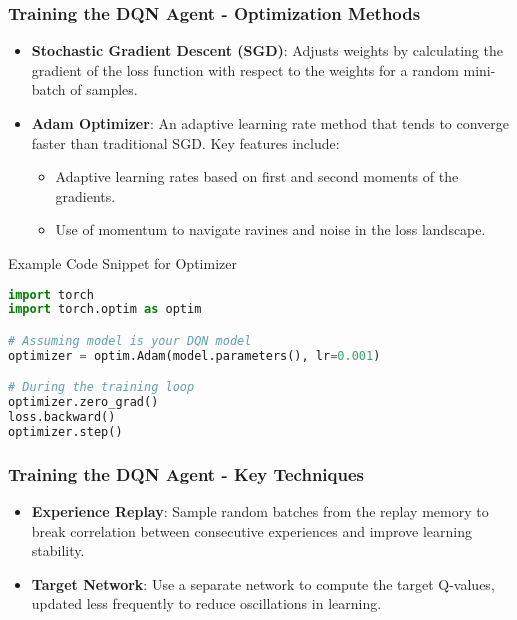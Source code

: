 \documentclass{beamer}
\begin{document}
\begin{frame}[fragile]
    \frametitle{Training the DQN Agent - Optimization Methods}
    \begin{itemize}
        \item \textbf{Stochastic Gradient Descent (SGD)}: 
        Adjusts weights by calculating the gradient of the loss function with respect to the weights for a random mini-batch of samples.

        \item \textbf{Adam Optimizer}: 
        An adaptive learning rate method that tends to converge faster than traditional SGD. Key features include:
        \begin{itemize}
            \item Adaptive learning rates based on first and second moments of the gradients.
            \item Use of momentum to navigate ravines and noise in the loss landscape.
        \end{itemize}
    \end{itemize}

    \begin{block}{Example Code Snippet for Optimizer}
    \begin{lstlisting}[language=Python]
import torch
import torch.optim as optim

# Assuming model is your DQN model
optimizer = optim.Adam(model.parameters(), lr=0.001)

# During the training loop
optimizer.zero_grad()
loss.backward()
optimizer.step()
    \end{lstlisting}
    \end{block}
\end{frame}

\begin{frame}
    \frametitle{Training the DQN Agent - Key Techniques}
    \begin{itemize}
        \item \textbf{Experience Replay}: 
        Sample random batches from the replay memory to break correlation between consecutive experiences and improve learning stability.
        
        \item \textbf{Target Network}: 
        Use a separate network to compute the target Q-values, updated less frequently to reduce oscillations in learning.
    \end{itemize}
\end{frame}
\end{document}
